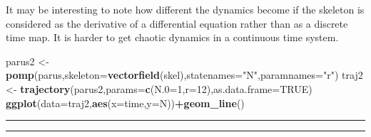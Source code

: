 \documentclass[]{article}
\newenvironment{Shaded}{\begin{snugshade}}{\end{snugshade}}
\newcommand{\KeywordTok}[1]{\textcolor[rgb]{0.13,0.29,0.53}{\textbf{#1}}}
\newcommand{\DataTypeTok}[1]{\textcolor[rgb]{0.13,0.29,0.53}{#1}}
\newcommand{\DecValTok}[1]{\textcolor[rgb]{0.00,0.00,0.81}{#1}}
\newcommand{\StringTok}[1]{\textcolor[rgb]{0.31,0.60,0.02}{#1}}
\newcommand{\OtherTok}[1]{\textcolor[rgb]{0.56,0.35,0.01}{#1}}
\newcommand{\OperatorTok}[1]{\textcolor[rgb]{0.81,0.36,0.00}{\textbf{#1}}}
\newcommand{\NormalTok}[1]{#1}
\begin{document}
It may be interesting to note how different the dynamics become if the
skeleton is considered as the derivative of a differential equation
rather than as a discrete time map. It is harder to get chaotic dynamics
in a continuous time system.

\begin{Shaded}
\begin{Highlighting}[]
\NormalTok{parus2 <-}\StringTok{ }\KeywordTok{pomp}\NormalTok{(parus,}\DataTypeTok{skeleton=}\KeywordTok{vectorfield}\NormalTok{(skel),}\DataTypeTok{statenames=}\StringTok{"N"}\NormalTok{,}\DataTypeTok{paramnames=}\StringTok{"r"}\NormalTok{)}
\NormalTok{traj2 <-}\StringTok{ }\KeywordTok{trajectory}\NormalTok{(parus2,}\DataTypeTok{params=}\KeywordTok{c}\NormalTok{(}\DataTypeTok{N.0=}\DecValTok{1}\NormalTok{,}\DataTypeTok{r=}\DecValTok{12}\NormalTok{),}\DataTypeTok{as.data.frame=}\OtherTok{TRUE}\NormalTok{)}
\KeywordTok{ggplot}\NormalTok{(}\DataTypeTok{data=}\NormalTok{traj2,}\KeywordTok{aes}\NormalTok{(}\DataTypeTok{x=}\NormalTok{time,}\DataTypeTok{y=}\NormalTok{N))}\OperatorTok{+}\KeywordTok{geom_line}\NormalTok{()}
\end{Highlighting}
\end{Shaded}

\begin{center} \end{center}

\begin{center}\rule{0.5\linewidth}{\linethickness}\end{center}

\begin{center}\rule{0.5\linewidth}{\linethickness}\end{center}
\end{document}
